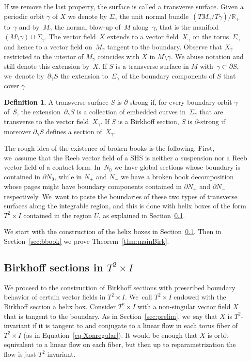 \documentclass[11pt]{article}
\theoremstyle{definition}
\newtheorem{defi}[theorem]{Definition}
\newcommand\R{\mathbb{R}}
\begin{document}
If we remove the last property, the surface is called a transverse surface. Given a periodic orbit $\gamma$ of $X$ we denote by $\Sigma_\gamma$ the unit normal bundle~$(TM_\gamma/T\gamma)/\R_+$ to~$\gamma$ and by~$M_\gamma$ the normal blow-up of~$M$ along~$\gamma$, that is the manifold~$(M\setminus\gamma)\cup \Sigma_\gamma$.
The vector field~$X$ extends to a vector field~$X_\gamma$ on the torus~$\Sigma_\gamma$ and hence to a vector field on~$M_\gamma$ tangent to the boundary. Observe that $X_\gamma$ restricted to the interior of $M_\gamma$ coincides with $X$ in $M\setminus \gamma$.
We abuse notation and still denote this extension by~$X$.
If $S$ is a transverse surface in $M$ with~$\gamma \subset \partial S$, we~denote by~$\partial_\gamma S$ the extension to~$\Sigma_\gamma$ of the boundary components of $S$ that cover $\gamma$.

\begin{defi}\label{defn-strong}
A transverse surface $S$ is $\partial$-strong if, for every boundary orbit $\gamma$ of~$S$, the extension~$\partial_\gamma S$ is a collection of embedded curves in~$\Sigma_\gamma$ that are transverse to the vector field~$X_\gamma$.
If $S$ is a Birkhoff section, $S$ is $\partial$-strong if moreover $\partial_\gamma S$ defines a section of~$X_\gamma$.
\end{defi}

The rough idea of the existence of broken books is the following. First, we~assume that the Reeb vector field of a SHS is neither a suspension nor a Reeb vector field of a contact form. In~$N_0$ we have global sections whose boundary is contained in $\partial N_0$, while in $N_+$ and $N_-$ we have a broken book decomposition whose pages might have boundary components contained in $\partial N_+$ and $\partial N_-$ respectively. We~want to paste the boundaries of these two types of transverse surfaces along the integrable region, and this is done with helix boxes of the form $T^2\times I$ contained in the region $U$, as explained in Section~\ref{sec:gluing}.

We start with the construction of the helix boxes
in Section~\ref{sec:gluing}. Then in Section~\ref{sec:bbook} we prove Theorem~\ref{thm:mainBirk}.

\subsection{Birkhoff sections in $T^2\times I$}\label{sec:gluing}

We proceed to the construction of Birkhoff sections with prescribed boundary behavior of certain vector fields in $T^2\times I$. We~call $T^2\times I$ endowed with the Birkhoff section a helix box. Consider $T^2\times I$ with a non-singular vector field $X$ that is tangent to the boundary. As in Section~\ref{sec:prelim}, we~say that $X$ is $T^2$-invariant if it is tangent to and conjugate to a linear flow in each torus fiber of $T^2\times I$ (as in Equation~\eqref{eq-Xonregular}). It would be enough that $X$ is orbit equivalent to a linear flow on each fiber, but then up to reparametrization the flow is just $T^2$-invariant.
\end{document}
